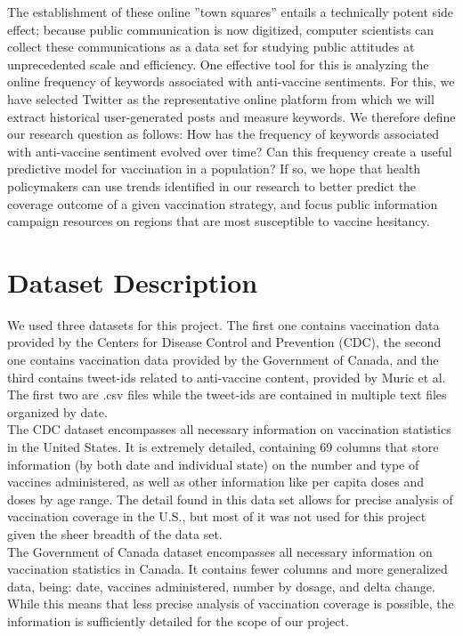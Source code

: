 \documentclass[fontsize=11pt]{article}
\begin{document}
The establishment of these online ”town squares” entails a technically potent side effect; because public communication is now digitized, computer scientists can collect these communications as a data set for studying public attitudes at unprecedented scale and efficiency. One effective tool for this is analyzing the online frequency of keywords associated with anti-vaccine sentiments. For this, we have selected Twitter as the representative online platform from which we will extract historical user-generated posts and measure keywords. We therefore define our research question as follows: How has the frequency of keywords associated with anti-vaccine sentiment evolved over time? Can this frequency create a useful predictive model for vaccination in a population? If so, we hope that health policymakers can use trends identified in our research to better predict the coverage outcome of a given vaccination strategy, and focus public information campaign resources on regions that are most susceptible to vaccine hesitancy.

\section*{Dataset Description}

We used three datasets for this project. The first one contains vaccination data provided by the Centers for Disease Control and Prevention (CDC), the second one contains vaccination data provided by the Government of Canada, and the third contains tweet-ids related to anti-vaccine content, provided by Muric et al. The first two are .csv files while the tweet-ids are contained in multiple text files organized by date. \\

The CDC dataset encompasses all necessary information on vaccination statistics in the United States. It is extremely detailed, containing 69 columns that store information (by both date and individual state) on the number and type of vaccines administered, as well as other information like per capita doses and doses by age range. The detail found in this data set allows for precise analysis of vaccination coverage in the U.S., but most of it was not used for this project given the sheer breadth of the data set.\\

The Government of Canada dataset encompasses all necessary information on vaccination statistics in Canada. It contains fewer columns and more generalized data, being: date, vaccines administered, number by dosage, and delta change. While this means that less precise analysis of vaccination coverage is possible, the information is sufficiently detailed for the scope of our project.\\
\end{document}
